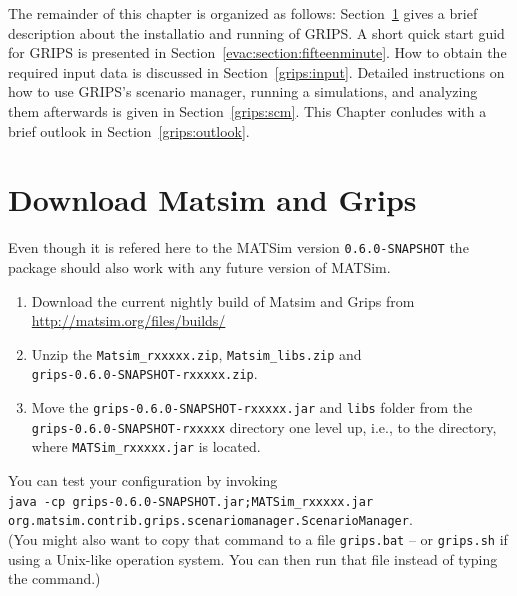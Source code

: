 The remainder of this chapter is organized as follows: Section~\ref{grips:install} gives a brief description about the installatio and running of GRIPS. 
A short quick start guid for GRIPS is presented in Section~\ref{evac:section:fifteenminute}. How to obtain the required input data is discussed in Section~\ref{grips:input}. Detailed instructions on how to use GRIPS's scenario manager, running a simulations, and analyzing them afterwards is given in  Section~\ref{grips:scm}. This Chapter conludes with a brief outlook in Section~\ref{grips:outlook}.


\section{Download Matsim and Grips}\label{grips:install}
Even though it is refered here to the MATSim version \verb|0.6.0-SNAPSHOT| the package should also work with any future version of MATSim.
\begin{enumerate}
\item 
Download the current nightly build of Matsim and Grips from
\url{http://matsim.org/files/builds/}
\item 
Unzip the \verb|Matsim_rxxxxx.zip|, \verb|Matsim_libs.zip| and\\
 \verb|grips-0.6.0-SNAPSHOT-rxxxxx.zip|.
\item 
Move the \verb|grips-0.6.0-SNAPSHOT-rxxxxx.jar| and \verb|libs| folder from the \verb|grips-0.6.0-SNAPSHOT-rxxxxx| directory one level up, 
i.e., to the directory, where \verb|MATSim_rxxxxx.jar| is located.
\end{enumerate}

You can test your configuration by invoking\\ 
\verb|java -cp grips-0.6.0-SNAPSHOT.jar;MATSim_rxxxxx.jar|\\ \verb|org.matsim.contrib.grips.scenariomanager.ScenarioManager|.\\
(You might also want to copy that command to a file \verb|grips.bat| -- or \verb|grips.sh| if using a Unix-like operation system. You can then run that file instead of typing the command.)


